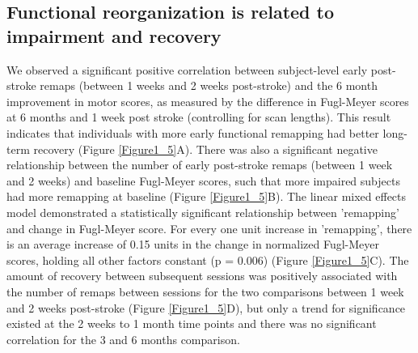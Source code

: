 \documentclass[phd,tocprelim]{cornell}
\begin{document}
	\subsection{Functional reorganization is related to impairment and recovery}
	We observed a significant positive correlation between subject-level early post-stroke remaps (between 1 weeks and 2 weeks post-stroke) and the 6 month improvement in motor scores, as measured by the difference in Fugl-Meyer scores at 6 months and 1 week post stroke (controlling for scan lengths). This result indicates that individuals with more early functional remapping had better long-term recovery (Figure \ref{Figure1_5}A). There was also a significant negative relationship between the number of early post-stroke remaps (between 1 week and 2 weeks) and baseline Fugl-Meyer scores, such that more impaired subjects had more remapping at baseline (Figure \ref{Figure1_5}B). The linear mixed effects model demonstrated a statistically significant relationship between 'remapping' and change in Fugl-Meyer score. For every one unit increase in 'remapping', there is an average increase of 0.15 units in the change in normalized Fugl-Meyer scores, holding all other factors constant (p = 0.006) (Figure \ref{Figure1_5}C). The amount of recovery between subsequent sessions was  positively associated with the number of remaps between sessions for the two comparisons between 1 week and 2 weeks post-stroke (Figure \ref{Figure1_5}D), but only a trend for significance existed at the 2 weeks to 1 month time points and there was no significant correlation for the 3 and 6 months comparison.
	
\end{document}
